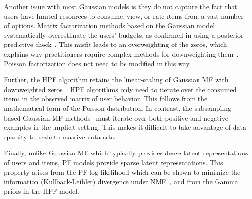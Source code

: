 Another issue with most Gaussian models is they do not capture the fact that
users have limited resources to consume, view, or rate items from a
vast number of options.
Matrix factorization methods based on the Gaussian
model systematically overestimate the users' budgets, as confirmed in  using a posterior predictive
check~\cite{Gelman:1996}. This misfit leads to an overweighting of the
zeros, which explains why practitioners require complex methods for
downweighting
them~\cite{Hu:2008p9402,Gantner:2012p9364,Dror:2012a,Paquet:2013p9197}.
Poisson factorization does not need to be modified in this way.


Further, the HPF algorithm retains the linear-scaling of Gaussian MF
with downweighted zeros~\cite{Hu:2008p9402}. HPF algorithms only need
to iterate over the consumed items in the observed matrix of user
behavior. This follows from the mathematical form of the Poisson
distribution.  In contrast, the subsampling-based Gaussian MF
methods~\cite{Gantner:2012p9364, Dror:2012a,Paquet:2013p9197} must
iterate over both positive and negative examples in the implicit
setting. This makes it difficult to take advantage of data sparsity to
scale to massive data sets.

Finally, unlike Gaussian MF which typically provides dense latent
representations of users and items, PF models provide sparse latent
representations. This property arises from the PF log-likelihood which
can be shown to minimize the information (Kullback-Leibler) divergence
under NMF~\cite{Cemgil:2009}, and from the Gamma priors in the HPF model.

